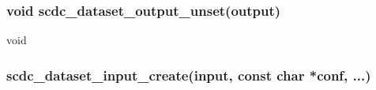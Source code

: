 \subsubsection[void scdc\_dataset\_output\_unset(scdc\_dataset\_output\_t *output)]
              {void scdc\_dataset\_output\_unset(\scdcdatasetoutputt *output)}\label{scdc_dataset_output_unset}
 
			{
			}
			{void}{}


\subsubsection[scdc\_dataset\_input\_t *scdc\_dataset\_input\_create(scdc\_dataset\_input\_t *input, const char *conf, ...)]
               {\scdcdatasetinputt *scdc\_dataset\_input\_create(\scdcdatasetinputt *input, const char *conf, ...)}\label{scdc_dataset_input_create}
 
